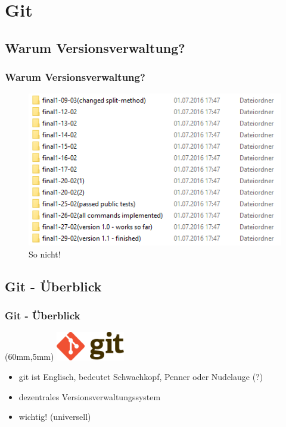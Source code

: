 \documentclass[18pt]{beamer}
\begin{document}
\section{Git}
	\subsection{Warum Versionsverwaltung?}
	\begin{frame}
		\frametitle{Warum Versionsverwaltung?}
		\begin{figure}
			\includegraphics[scale=0.7]{./pics/tut0/bad-version-management.png}
			\linebreak
			\centering 			So nicht!
		\end{figure}	
	\end{frame}
	
	\subsection{Git - Überblick}
	\begin{frame}
		\frametitle{Git - Überblick}
		\begin{textblock*}{20mm}(60mm,5mm)
			\includegraphics[width=30mm, scale=0.8]{./pics/tut0/Git-logo.png}
		\end{textblock*}
		\begin{itemize}
			\item git ist Englisch, bedeutet Schwachkopf, Penner oder Nudelauge (?)
			\item dezentrales Versionsverwaltungssystem
			\item wichtig! (universell)
		\end{itemize}
	\end{frame}
	
\end{document}

